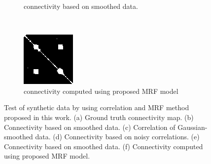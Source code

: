 \begin{figure}[p]
\begin{subfigure}[t]{0.3\textwidth}
    \caption{connectivity based on smoothed data.}
    \label{fig:6dconn5}
    \end{subfigure}
~
  \begin{subfigure}[t]{0.3\textwidth}
    \centering
    \includegraphics[width=\textwidth]{figures/method1/newtoy/newpost_sym2}
    \caption{connectivity computed using proposed MRF model}
    \label{fig:6dconn6}
    \end{subfigure}

    \caption[Test on synthetic data.]{Test of synthetic data by using
      correlation and MRF method proposed in this work. (a) Ground truth
      connectivity map. (b) Connectivity based on smoothed data. (c)
      Correlation of Gaussian-smoothed data. (d) Connectivity based on noisy
      correlations. (e) Connectivity based on smoothed data. (f) Connectivity
      computed using proposed MRF model. }
  \label{fig:6dconn}
\end{figure}


